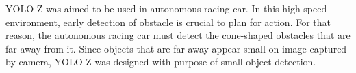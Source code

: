   YOLO-Z was aimed to be used in autonomous racing car. In this high speed environment, early detection
  of obstacle is crucial to plan for action. For that reason, the autonomous racing car must detect the cone-shaped obstacles
  that are far away from it. Since objects that are far away appear small on image captured by camera, YOLO-Z was designed with
  purpose of small object detection.


